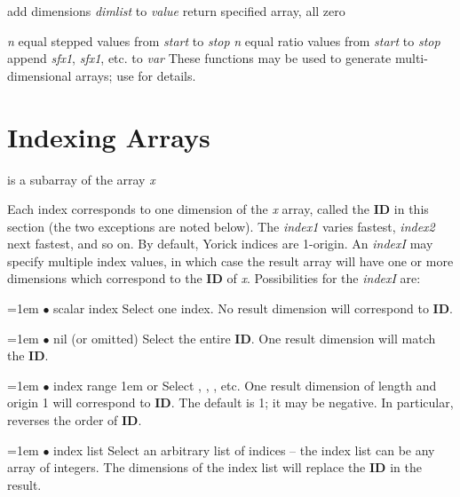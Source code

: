        {add dimensions {\it dimlist\/} to {\it value}}
       {return specified array, all zero}

       {{\it n} equal stepped values from {\it start\/} to {\it stop}}
       {{\it n} equal ratio values from {\it start\/} to {\it stop}}
       {append {\it sfx1}, {\it sfx1}, etc. to {\it var}}
These functions may be used to generate multi-dimensional arrays;
 use  for details.

\section{Indexing Arrays}

       {is a subarray of the array {\it x}}

Each index corresponds to one dimension of the {\it x} array, called
the {\bf ID} in this section (the two exceptions are noted below).
The {\it index1\/} varies fastest, {\it index2\/} next fastest, and so
on.  By default, Yorick indices are 1-origin.  An {\it indexI\/} may
specify multiple index values, in which case the result array will
have one or more dimensions which correspond to the {\bf ID} of
{\it x}.  Possibilities for the {\it indexI} are:

\hangindent=1em
$\bullet$ scalar index \hfil\break
Select one index.  No result dimension will correspond to {\bf ID}.

\hangindent=1em
$\bullet$ nil (or omitted) \hfil\break
Select the entire {\bf ID}.  One result dimension will match the {\bf ID}.

\hangindent=1em
$\bullet$ index range \hglue 1em  or
 \hfil\break
Select , , , etc.  One
result dimension of length  and origin 1
will correspond to {\bf ID}.  The default  is 1; it may be
negative.  In particular,  reverses the order of {\bf ID}.

\hangindent=1em
$\bullet$ index list \hfil\break
Select an arbitrary list of indices -- the index list can be any array of
integers.  The dimensions of the index list will replace the {\bf ID} in
the result.

